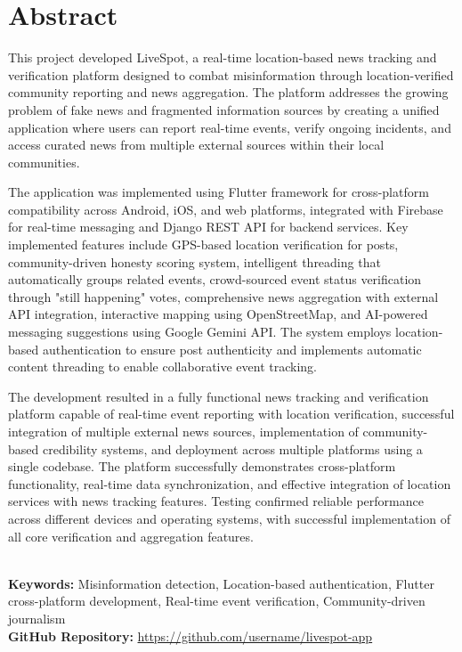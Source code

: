\chapter*{\center \Large  Abstract}

This project developed LiveSpot, a real-time location-based news tracking and verification platform designed to combat misinformation through location-verified community reporting and news aggregation. The platform addresses the growing problem of fake news and fragmented information sources by creating a unified application where users can report real-time events, verify ongoing incidents, and access curated news from multiple external sources within their local communities.

The application was implemented using Flutter framework for cross-platform compatibility across Android, iOS, and web platforms, integrated with Firebase for real-time messaging and Django REST API for backend services. Key implemented features include GPS-based location verification for posts, community-driven honesty scoring system, intelligent threading that automatically groups related events, crowd-sourced event status verification through "still happening" votes, comprehensive news aggregation with external API integration, interactive mapping using OpenStreetMap, and AI-powered messaging suggestions using Google Gemini API. The system employs location-based authentication to ensure post authenticity and implements automatic content threading to enable collaborative event tracking.

The development resulted in a fully functional news tracking and verification platform capable of real-time event reporting with location verification, successful integration of multiple external news sources, implementation of community-based credibility systems, and deployment across multiple platforms using a single codebase. The platform successfully demonstrates cross-platform functionality, real-time data synchronization, and effective integration of location services with news tracking features. Testing confirmed reliable performance across different devices and operating systems, with successful implementation of all core verification and aggregation features.


~\\[1cm]
\noindent %
\textbf{Keywords:} Misinformation detection, Location-based authentication, Flutter cross-platform development, Real-time event verification, Community-driven journalism\\[0.5 cm]
\noindent
\textbf{GitHub Repository:} \url{https://github.com/username/livespot-app}

\vfill
